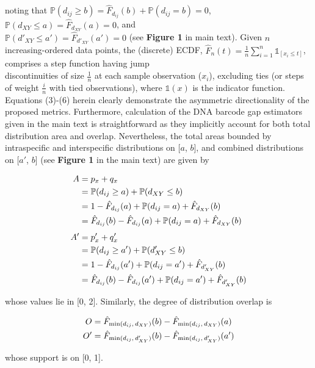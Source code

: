 \documentclass[12pt]{article}
\begin{document}
\noindent noting that $\mathbb{P}(d_{ij} \geq b) = \hat{F}_{d_{ij}}(b) +\mathbb{P}(d_{ij} = b) = 0$, $\mathbb{P}(d_{XY} \leq a) = \hat{F}_{d_{XY}}(a) = 0$, and \\ $\mathbb{P}(d'_{XY} \leq a') = \hat{F}_{d'_{XY}}(a') = 0$ (see \textbf{Figure 1} in main text). Given $n$ increasing-ordered data points, the (discrete) ECDF, $\hat{F}_n(t) = \frac{1}{n}\sum_{i = 1}^n\mathds{1}_{[x_i \leq t]}$, comprises a step function having jump \\ discontinuities of size $\frac{1}{n}$ at each sample observation ($x_i$), excluding ties (or steps of weight $\frac{i}{n}$ with tied observations), where $\mathds{1}(x)$ is the indicator function. Equations (3)-(6) herein clearly demonstrate the asymmetric directionality of the proposed metrics. Furthermore, calculation of the DNA barcode gap estimators given in the main text is straightforward as they implicitly account for both total distribution area and overlap. Nevertheless, the total areas bounded by intraspecific and interspecific distributions on [$a$, $b$], and combined distributions on [$a'$, $b$] (see \textbf{Figure 1} in the main text) are given by

\begin{align}
\notag A &= p_x + q_x \\ 
\notag &= \mathbb{P}(d_{ij} \geq a) + \mathbb{P}(d_{XY} \leq b) \\
\notag  &= 1 - \hat{F}_{d_{ij}}(a) + \mathbb{P}(d_{ij} = a) + \hat{F}_{d_{XY}}(b) \\
  &= \hat{F}_{d_{ij}}(b) - \hat{F}_{d_{ij}}(a) + \mathbb{P}(d_{ij} = a) + \hat{F}_{d_{XY}}(b) \\[1ex]
\notag A' &= p'_x + q'_x \\
\notag &= \mathbb{P}(d_{ij} \geq a') + \mathbb{P}(d'_{XY} \leq b) \\
\notag &= 1 - \hat{F}_{d_{ij}}(a') + \mathbb{P}(d_{ij} = a') + \hat{F}_{d'_{XY}}(b) \\
  &= \hat{F}_{d_{ij}}(b) - \hat{F}_{d_{ij}}(a') + \mathbb{P}(d_{ij} = a') + \hat{F}_{d'_{XY}}(b)
\end{align}

\noindent whose values lie in [0, 2]. Similarly, the degree of distribution overlap is

\begin{align}
\notag O &= \hat{F}_{\mathrm{min}(d_{ij}, \hspace{0.5mm} d_{XY})}(b) - \hat{F}_{\mathrm{min}(d_{ij}, \hspace{0.5mm} d_{XY})}(a) \\
\notag O' &= \hat{F}_{\mathrm{min}(d_{ij}, \hspace{0.5mm} d'_{XY})}(b) - \hat{F}_{\mathrm{min}(d_{ij}, \hspace{0.5mm} d'_{XY})}(a') 
\end{align}

\noindent whose support is on [0, 1].
\end{document}
